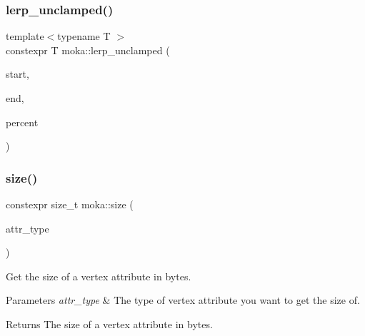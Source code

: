 \subsubsection{\texorpdfstring{lerp\_unclamped()}{lerp\_unclamped()}}
{\footnotesize\ttfamily template$<$typename T $>$ \\
constexpr T moka\+::lerp\+\_\+unclamped (\begin{DoxyParamCaption}\item[{const T \&}]{start,  }\item[{const T \&}]{end,  }\item[{const float}]{percent }\end{DoxyParamCaption})\hspace{0.3cm}{\ttfamily [noexcept]}}

\mbox{\label{namespacemoka_a4f125ee95d9889b23c3259d1fba4c2e4}} 
\subsubsection{\texorpdfstring{size()}{size()}}
{\footnotesize\ttfamily constexpr size\+\_\+t moka\+::size (\begin{DoxyParamCaption}\item[{const \mbox{\hyperlink{namespacemoka_a1fe222f346eb65977e1069323023faa5}{attribute\+\_\+type}}}]{attr\+\_\+type }\end{DoxyParamCaption})}



Get the size of a vertex attribute in bytes. 


\begin{DoxyParams}{Parameters}
{\em attr\+\_\+type} & The type of vertex attribute you want to get the size of. \\
\hline
\end{DoxyParams}
\begin{DoxyReturn}{Returns}
The size of a vertex attribute in bytes. 
\end{DoxyReturn}
\mbox{\label{namespacemoka_ad4baf5eb8971d3d74d1c21401ef1b162}} 
